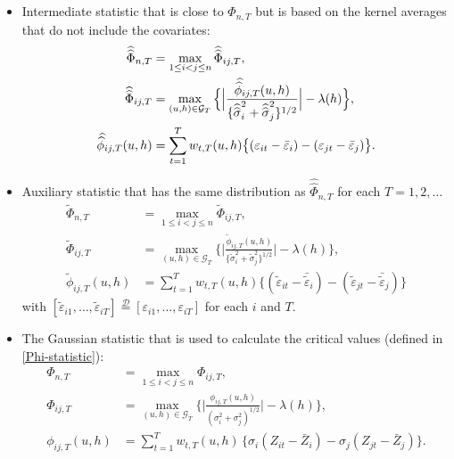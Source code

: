 \documentclass[a4paper,12pt]{article}
\newcommand{\doublehat}[1]{\skew{5.5}\widehat{\widehat{#1}}}
\newcommand{\doublehattwo}[1]{\widehat{\widehat{#1}}}
\begin{document}
\begin{itemize}
\item Intermediate statistic that is close to $\widehat{\Phi}_{n, T}$ but is based on the kernel averages that do not include the covariates:
\begin{align}\label{eq-stat-3}
	\doublehattwo{\Phi}_{n,T} &= \max_{1 \le i < j \le n} \doublehattwo{\Phi}_{ij,T},\nonumber \\
	\doublehattwo{\Phi}_{ij,T} &= \max_{(u,h) \in \mathcal{G}_T} \Big\{ \Big| \frac{\doublehat{\phi}_{ij,T}(u,h)} {\{ \doublehattwo{\sigma}_i^2 + \doublehattwo{\sigma}_j^2 \}^{1/2}} \Big| - \lambda(h) \Big \}, \\
	 \doublehat{\phi}_{ij,T}(u,h) &= \sum_{t=1}^T w_{t,T}(u,h) \big\{ (\varepsilon_{it} - \bar{\varepsilon}_i) - (\varepsilon_{jt} - \bar{\varepsilon}_j)  \big\}.\nonumber 
\end{align}
\item Auxiliary statistic that has the same distribution as $\doublehattwo{\Phi}_{n, T}$ for each $T = 1, 2, \ldots$
\begin{align}\label{eq-stat-4}
\widetilde{\Phi}_{n,T} &= \max_{1 \le i < j \le n} \widetilde{\Phi}_{ij,T},\nonumber\\
\widetilde{\Phi}_{ij, T} &= \max_{(u,h) \in \mathcal{G}_T} \Big\{ \Big|\frac{\widetilde{\phi}_{ij, T}(u,h)}{\{\widetilde{\sigma}_i^2 + \widetilde{\sigma}_j^2 \}^{1/2}} \Big| - \lambda(h) \Big\}, \\
\widetilde{\phi}_{ij, T}(u,h) &= \sum\nolimits_{t=1}^T w_{t,T}(u,h) \big\{ (\widetilde{\varepsilon}_{it} - \bar{\widetilde{\varepsilon}}_i)  - (\widetilde{\varepsilon}_{jt} - \bar{\widetilde{\varepsilon}}_j)\big\}\nonumber
\end{align}
with $[\widetilde{\varepsilon}_{i1},\ldots,\widetilde{\varepsilon}_{iT}] \stackrel{\mathcal{D}}{=} [\varepsilon_{i1},\ldots,\varepsilon_{iT}]$ for each $i$ and $T$.

\item The Gaussian statistic that is used to calculate the critical values (defined in \eqref{Phi-statistic}):
\begin{align}\label{eq-stat-5}
	\Phi_{n,T}  &= \max_{1 \le i < j \le n} \Phi_{ij,T}, \nonumber\\
      	\Phi_{ij,T} &= \max_{(u,h) \in \mathcal{G}_T} \Big\{ \Big|\frac{\phi_{ij,T}(u,h)}{({\sigma}_i^2 + {\sigma}_j^2)^{1/2}}\Big| - \lambda(h) \Big\},\\
	 \phi_{ij,T}(u,h) & = \sum\nolimits_{t=1}^T w_{t,T}(u,h) \, \big\{{\sigma}_i (Z_{it} - \bar{Z}_i) - {\sigma}_j (Z_{jt} - \bar{Z}_j) \big\}.\nonumber
\end{align}
\end{itemize}
\end{document}
